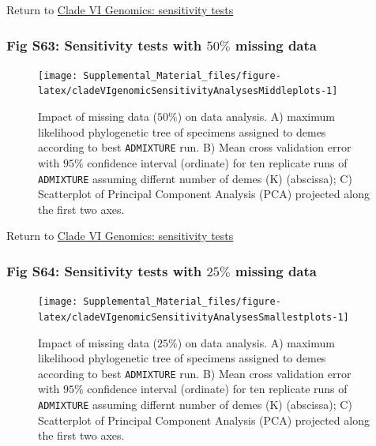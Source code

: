 \documentclass[
  11pt,
]{article}
\begin{document}
Return to \protect\hyperlink{sensitivity-tests-5}{Clade VI Genomics: sensitivity tests}
\pagebreak

\hypertarget{fig-s63-sensitivity-tests-with-50-missing-data}{%
\subsubsection{\texorpdfstring{Fig S63: Sensitivity tests with \(50\%\) missing data}{Fig S63: Sensitivity tests with 50\textbackslash\% missing data}}\label{fig-s63-sensitivity-tests-with-50-missing-data}}

\begin{figure}
\texttt{[image: Supplemental\_Material\_files/figure-latex/cladeVIgenomicSensitivityAnalysesMiddleplots-1]} \caption{Impact of missing data ($50\%$) on data analysis. A) maximum likelihood phylogenetic tree of specimens assigned to demes according to best \texttt{ADMIXTURE} run. B) Mean cross validation error with $95\%$ confidence interval (ordinate) for ten replicate runs of \texttt{ADMIXTURE} assuming differnt number of demes (K) (abscissa); C) Scatterplot of Principal Component Analysis (PCA) projected along the first two axes.}\label{fig:cladeVIgenomicSensitivityAnalysesMiddleplots}
\end{figure}

Return to \protect\hyperlink{sensitivity-tests-5}{Clade VI Genomics: sensitivity tests}
\pagebreak

\hypertarget{fig-s64-sensitivity-tests-with-25-missing-data}{%
\subsubsection{\texorpdfstring{Fig S64: Sensitivity tests with \(25\%\) missing data}{Fig S64: Sensitivity tests with 25\textbackslash\% missing data}}\label{fig-s64-sensitivity-tests-with-25-missing-data}}

\begin{figure}
\texttt{[image: Supplemental\_Material\_files/figure-latex/cladeVIgenomicSensitivityAnalysesSmallestplots-1]} \caption{Impact of missing data ($25\%$) on data analysis. A) maximum likelihood phylogenetic tree of specimens assigned to demes according to best \texttt{ADMIXTURE} run. B) Mean cross validation error with $95\%$ confidence interval (ordinate) for ten replicate runs of \texttt{ADMIXTURE} assuming differnt number of demes (K) (abscissa); C) Scatterplot of Principal Component Analysis (PCA) projected along the first two axes.}\label{fig:cladeVIgenomicSensitivityAnalysesSmallestplots}
\end{figure}
\end{document}
